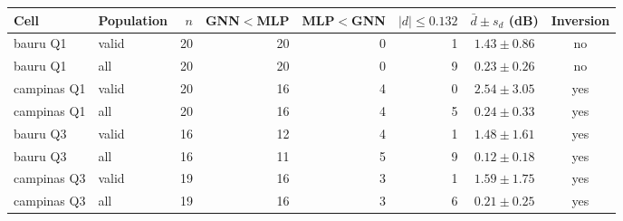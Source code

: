 \begin{tabular}{llrrrrcc}
\hline
Cell & Population & $n$ & GNN$<$MLP & MLP$<$GNN & $|d|\le 0.132$ & $\bar d \pm s_d$ (dB) & Inversion \\
\hline
bauru Q1 & valid & 20 & 20 & 0 & 1 & $1.43 \pm 0.86$ & no \\
bauru Q1 & all & 20 & 20 & 0 & 9 & $0.23 \pm 0.26$ & no \\
campinas Q1 & valid & 20 & 16 & 4 & 0 & $2.54 \pm 3.05$ & yes \\
campinas Q1 & all & 20 & 16 & 4 & 5 & $0.24 \pm 0.33$ & yes \\
bauru Q3 & valid & 16 & 12 & 4 & 1 & $1.48 \pm 1.61$ & yes \\
bauru Q3 & all & 16 & 11 & 5 & 9 & $0.12 \pm 0.18$ & yes \\
campinas Q3 & valid & 19 & 16 & 3 & 1 & $1.59 \pm 1.75$ & yes \\
campinas Q3 & all & 19 & 16 & 3 & 6 & $0.21 \pm 0.25$ & yes \\
\hline
\end{tabular}
